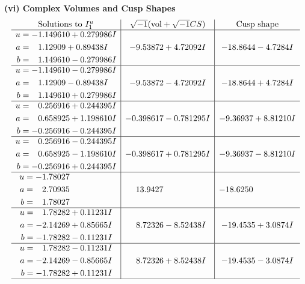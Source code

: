\documentclass[1p]{elsarticle_modified}
\theoremstyle{definition}
\newcommand{\I}{\sqrt{-1}}
\begin{document}
\newpage\flushleft \textbf{(vi) Complex Volumes and Cusp Shapes}
$$\begin{array}{c|c|c}  
\text{Solutions to }I^u_{1}& \I (\text{vol} + \sqrt{-1}CS) & \text{Cusp shape}\\
 \hline 
\begin{aligned}
u &= -1.149610 + 0.279986 I \\
a &= \phantom{-}1.12909 + 0.89438 I \\
b &= \phantom{-}1.149610 - 0.279986 I\end{aligned}
 & -9.53872 + 4.72092 I & -18.8644 - 4.7284 I \\ \hline\begin{aligned}
u &= -1.149610 - 0.279986 I \\
a &= \phantom{-}1.12909 - 0.89438 I \\
b &= \phantom{-}1.149610 + 0.279986 I\end{aligned}
 & -9.53872 - 4.72092 I & -18.8644 + 4.7284 I \\ \hline\begin{aligned}
u &= \phantom{-}0.256916 + 0.244395 I \\
a &= \phantom{-}0.658925 + 1.198610 I \\
b &= -0.256916 - 0.244395 I\end{aligned}
 & -0.398617 - 0.781295 I & -9.36937 + 8.81210 I \\ \hline\begin{aligned}
u &= \phantom{-}0.256916 - 0.244395 I \\
a &= \phantom{-}0.658925 - 1.198610 I \\
b &= -0.256916 + 0.244395 I\end{aligned}
 & -0.398617 + 0.781295 I & -9.36937 - 8.81210 I \\ \hline\begin{aligned}
u &= -1.78027\phantom{ +0.000000I} \\
a &= \phantom{-}2.70935\phantom{ +0.000000I} \\
b &= \phantom{-}1.78027\phantom{ +0.000000I}\end{aligned}
 & \phantom{-}13.9427\phantom{ +0.000000I} & -18.6250\phantom{ +0.000000I} \\ \hline\begin{aligned}
u &= \phantom{-}1.78282 + 0.11231 I \\
a &= -2.14269 + 0.85665 I \\
b &= -1.78282 - 0.11231 I\end{aligned}
 & \phantom{-}8.72326 - 8.52438 I & -19.4535 + 3.0874 I \\ \hline\begin{aligned}
u &= \phantom{-}1.78282 - 0.11231 I \\
a &= -2.14269 - 0.85665 I \\
b &= -1.78282 + 0.11231 I\end{aligned}
 & \phantom{-}8.72326 + 8.52438 I & -19.4535 - 3.0874 I\\
 \hline 
 \end{array}$$\newpage\newpage\renewcommand{\arraystretch}{1}
\end{document}
